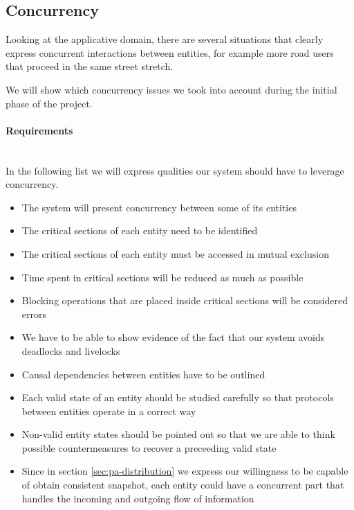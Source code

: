 \subsection{Concurrency}\label{sec:pa-concurrency}
Looking at the applicative domain, there are several situations that clearly
express concurrent interactions between entities, for example more road users
that proceed in the same street stretch.

We will show which concurrency issues we took into account during the initial phase of
the project.

\paragraph{Requirements} \mbox{} \\

In the following list we will express qualities our system should have to
leverage concurrency.

\begin{itemize}
\item The system will present concurrency between some of its entities
\item The critical sections of each entity need to be identified
\item The critical sections of each entity  must be accessed in mutual exclusion
\item Time spent in critical sections will be reduced as much as possible
\item Blocking operations that are placed inside critical sections will be
  considered errors
\item We have to be able to show evidence of the fact that our system avoids
  deadlocks and livelocks
\item Causal dependencies between entities have to be outlined
\item Each valid state of an entity should be studied carefully so that
  protocols between entities operate in a correct way
\item Non-valid entity states should be pointed out so that we are able to
  think possible countermeasures to recover a preceeding valid state
\item Since in section \ref{sec:pa-distribution} we express our willingness to
  be capable of obtain consistent snapshot, each entity could have a concurrent
  part that handles the incoming and outgoing flow of information
\end{itemize}

